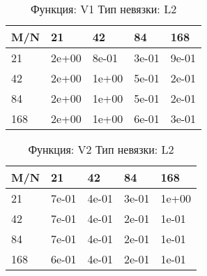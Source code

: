 \documentclass[a4paper,11pt]{article}
\begin{document}
\begin{table}[H]
\caption {Функция: V1 Тип невязки: L2  }
\begin{center}
\begin{tabular}{l|l|l|l|l}
\hline
M/N  & 21 & 42 & 84 & 168 \\ \hline
  21 & 2e+00& 8e-01& 3e-01& 9e-01\\ \hline
  42 & 2e+00& 1e+00& 5e-01& 2e-01\\ \hline
  84 & 2e+00& 1e+00& 5e-01& 2e-01\\ \hline
 168 & 2e+00& 1e+00& 6e-01& 3e-01\\ \hline
\end{tabular}
\end{center}
\end{table}
\begin{table}[H]
\caption {Функция: V2 Тип невязки: L2  }
\begin{center}
\begin{tabular}{l|l|l|l|l}
\hline
M/N  & 21 & 42 & 84 & 168 \\ \hline
  21 & 7e-01& 4e-01& 3e-01& 1e+00\\ \hline
  42 & 7e-01& 4e-01& 2e-01& 1e-01\\ \hline
  84 & 7e-01& 4e-01& 2e-01& 1e-01\\ \hline
 168 & 6e-01& 4e-01& 2e-01& 1e-01\\ \hline
\end{tabular}
\end{center}
\end{table}
\end{document}
